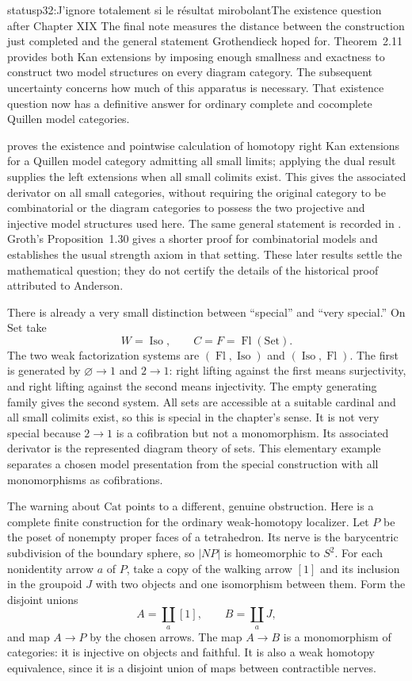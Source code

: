 \begin{dcomment}{status}{p32:J'ignore totalement si le résultat mirobolant}{The existence question after Chapter XIX}
The final note measures the distance between the construction just completed and the general statement Grothendieck hoped for. Theorem~2.11 provides both Kan extensions by imposing enough smallness and exactness to construct two model structures on every diagram category. The subsequent uncertainty concerns how much of this apparatus is necessary. That existence question now has a definitive answer for ordinary complete and cocomplete Quillen model categories.

\citet[Theorem~6.11]{Cisinski2003} proves the existence and pointwise calculation of homotopy right Kan extensions for a Quillen model category admitting all small limits; applying the dual result supplies the left extensions when all small colimits exist. This gives the associated derivator on all small categories, without requiring the original category to be combinatorial or the diagram categories to possess the two projective and injective model structures used here. The same general statement is recorded in \citet[Theorem~1.32]{Groth2013}. Groth's Proposition~1.30 gives a shorter proof for combinatorial models and establishes the usual strength axiom in that setting. These later results settle the mathematical question; they do not certify the details of the historical proof attributed to Anderson.

There is already a very small distinction between ``special'' and ``very special.'' On $\mathrm{Set}$ take
\[
 W=\operatorname{Iso},\qquad C=F=\operatorname{Fl}(\mathrm{Set}).
\]
The two weak factorization systems are $(\operatorname{Fl},\operatorname{Iso})$ and $(\operatorname{Iso},\operatorname{Fl})$. The first is generated by $\varnothing\to1$ and $2\to1$: right lifting against the first means surjectivity, and right lifting against the second means injectivity. The empty generating family gives the second system. All sets are accessible at a suitable cardinal and all small colimits exist, so this is special in the chapter's sense. It is not very special because $2\to1$ is a cofibration but not a monomorphism. Its associated derivator is the represented diagram theory of sets. This elementary example separates a chosen model presentation from the special construction with all monomorphisms as cofibrations.

The warning about $\mathrm{Cat}$ points to a different, genuine obstruction. Here is a complete finite construction for the ordinary weak-homotopy localizer. Let $P$ be the poset of nonempty proper faces of a tetrahedron. Its nerve is the barycentric subdivision of the boundary sphere, so $|NP|$ is homeomorphic to $S^2$. For each nonidentity arrow $a$ of $P$, take a copy of the walking arrow $[1]$ and its inclusion in the groupoid $J$ with two objects and one isomorphism between them. Form the disjoint unions
\[
 A=\coprod_a[1],\qquad B=\coprod_a J,
\]
and map $A\to P$ by the chosen arrows. The map $A\to B$ is a monomorphism of categories: it is injective on objects and faithful. It is also a weak homotopy equivalence, since it is a disjoint union of maps between contractible nerves.


\end{dcomment}
